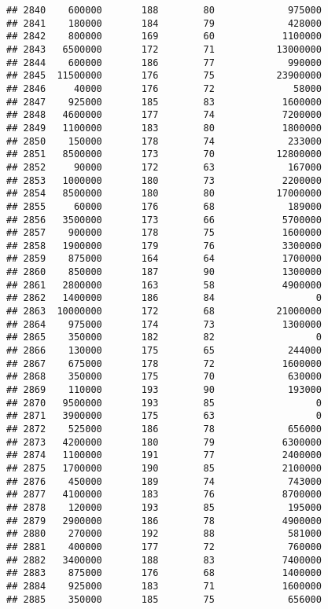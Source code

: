 \documentclass[
]{article}
\begin{document}
\begin{verbatim}
## 2840    600000       188        80             975000
## 2841    180000       184        79             428000
## 2842    800000       169        60            1100000
## 2843   6500000       172        71           13000000
## 2844    600000       186        77             990000
## 2845  11500000       176        75           23900000
## 2846     40000       176        72              58000
## 2847    925000       185        83            1600000
## 2848   4600000       177        74            7200000
## 2849   1100000       183        80            1800000
## 2850    150000       178        74             233000
## 2851   8500000       173        70           12800000
## 2852     90000       172        63             167000
## 2853   1000000       180        73            2200000
## 2854   8500000       180        80           17000000
## 2855     60000       176        68             189000
## 2856   3500000       173        66            5700000
## 2857    900000       178        75            1600000
## 2858   1900000       179        76            3300000
## 2859    875000       164        64            1700000
## 2860    850000       187        90            1300000
## 2861   2800000       163        58            4900000
## 2862   1400000       186        84                  0
## 2863  10000000       172        68           21000000
## 2864    975000       174        73            1300000
## 2865    350000       182        82                  0
## 2866    130000       175        65             244000
## 2867    675000       178        72            1600000
## 2868    350000       175        70             630000
## 2869    110000       193        90             193000
## 2870   9500000       193        85                  0
## 2871   3900000       175        63                  0
## 2872    525000       186        78             656000
## 2873   4200000       180        79            6300000
## 2874   1100000       191        77            2400000
## 2875   1700000       190        85            2100000
## 2876    450000       189        74             743000
## 2877   4100000       183        76            8700000
## 2878    120000       193        85             195000
## 2879   2900000       186        78            4900000
## 2880    270000       192        88             581000
## 2881    400000       177        72             760000
## 2882   3400000       188        83            7400000
## 2883    875000       176        68            1400000
## 2884    925000       183        71            1600000
## 2885    350000       185        75             656000

\end{verbatim}
\end{document}
